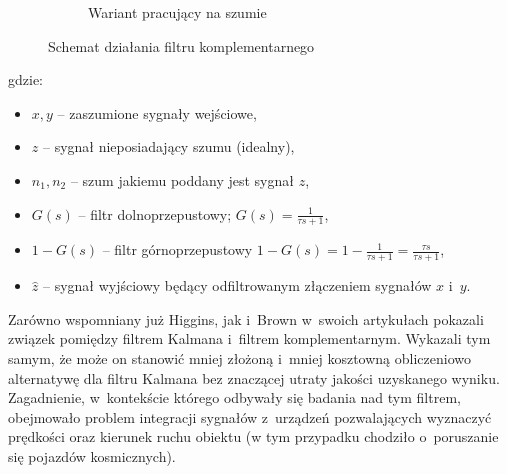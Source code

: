 \begin{savenotes}
\begin{figure}[!htb]
\begin{subfigure}[b]{0.49\textwidth}
		\caption{Wariant pracujący na szumie}
		\label{fig:appx:CF:algorithmB}			
	\end{subfigure}
	\caption{Schemat działania filtru komplementarnego}
	\label{fig:appx:CF:algorithm}					
\end{figure}\end{savenotes}

gdzie:
\begin{itemize}
	\item $x, y$ -- zaszumione sygnały wejściowe,
	\item $z$ -- sygnał nieposiadający szumu (idealny),
	\item $n_1, n_2$ -- szum jakiemu poddany jest sygnał $z$,
	\item $G(s)$ -- filtr dolnoprzepustowy; $G(s) = \frac{1}{{\tau}s+1}$,
	\item $1 - G(s)$ -- filtr górnoprzepustowy $1 - G(s) = 1 - \frac{1}{{\tau}s+1} = \frac{{\tau}s}{{\tau}s+1}$,
	\item $\widehat{z}$ -- sygnał wyjściowy będący odfiltrowanym złączeniem sygnałów $x$ i~$y$.
\end{itemize}

Zarówno wspomniany już Higgins, jak i~Brown \cite{BROWN1972} w~swoich artykułach pokazali związek pomiędzy filtrem Kalmana i~filtrem komplementarnym. Wykazali tym samym, że może on stanowić mniej złożoną i~mniej kosztowną obliczeniowo alternatywę dla filtru Kalmana bez znaczącej utraty jakości uzyskanego wyniku. Zagadnienie, w~kontekście którego odbywały się badania nad tym filtrem, obejmowało problem integracji sygnałów z~urządzeń pozwalających wyznaczyć prędkości oraz kierunek ruchu obiektu (w tym przypadku chodziło o~poruszanie się pojazdów kosmicznych).
